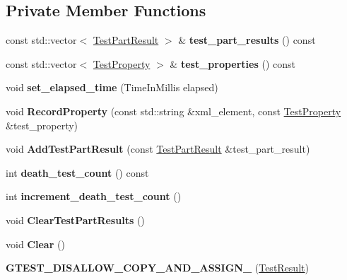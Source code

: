 \subsection*{Private Member Functions}
\begin{DoxyCompactItemize}
\item 
\mbox{\label{classtesting_1_1_test_result_a2964c3a12ef6ef9bcb47599374514432}} 
const std\+::vector$<$ \hyperlink{classtesting_1_1_test_part_result}{Test\+Part\+Result} $>$ \& {\bfseries test\+\_\+part\+\_\+results} () const
\item 
\mbox{\label{classtesting_1_1_test_result_a8c94e8e89c616abe5d33024a6b54f218}} 
const std\+::vector$<$ \hyperlink{classtesting_1_1_test_property}{Test\+Property} $>$ \& {\bfseries test\+\_\+properties} () const
\item 
\mbox{\label{classtesting_1_1_test_result_aa345325e5dea41609d17d7c614bf2b18}} 
void {\bfseries set\+\_\+elapsed\+\_\+time} (Time\+In\+Millis elapsed)
\item 
\mbox{\label{classtesting_1_1_test_result_ac253b0fd7ea70f457e9517e415eac32d}} 
void {\bfseries Record\+Property} (const std\+::string \&xml\+\_\+element, const \hyperlink{classtesting_1_1_test_property}{Test\+Property} \&test\+\_\+property)
\item 
\mbox{\label{classtesting_1_1_test_result_ac28e9821ad3e9314c4fe41b119c5b44d}} 
void {\bfseries Add\+Test\+Part\+Result} (const \hyperlink{classtesting_1_1_test_part_result}{Test\+Part\+Result} \&test\+\_\+part\+\_\+result)
\item 
\mbox{\label{classtesting_1_1_test_result_a827cb78135ac375d81d89ffedc3eca52}} 
int {\bfseries death\+\_\+test\+\_\+count} () const
\item 
\mbox{\label{classtesting_1_1_test_result_a07faaa1d16a991f34222d02e10c75dc2}} 
int {\bfseries increment\+\_\+death\+\_\+test\+\_\+count} ()
\item 
\mbox{\label{classtesting_1_1_test_result_aa11ed718e0a76a39e6380e5ddce7cae2}} 
void {\bfseries Clear\+Test\+Part\+Results} ()
\item 
\mbox{\label{classtesting_1_1_test_result_a5371bc2e69435b4cb1fdad9ca81759a6}} 
void {\bfseries Clear} ()
\item 
\mbox{\label{classtesting_1_1_test_result_ad04e1d5d9eb623ba1d9fc82cdff43af4}} 
{\bfseries G\+T\+E\+S\+T\+\_\+\+D\+I\+S\+A\+L\+L\+O\+W\+\_\+\+C\+O\+P\+Y\+\_\+\+A\+N\+D\+\_\+\+A\+S\+S\+I\+G\+N\+\_\+} (\hyperlink{classtesting_1_1_test_result}{Test\+Result})
\end{DoxyCompactItemize}
